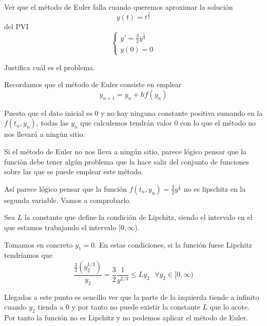 \begin{problem}[2]
Ver que el método de Euler falla cuando queremos aproximar la solución
\[y(t) = t^{\frac{3}{2}}\]
del PVI
\[\left\{ \begin{array}{l}y'=\frac{3}{2}y^{\frac{1}{3}} \\
y(0)=0\end{array}
\right.\]

Justifica cuál es el problema.

\solution
{}

Recordamos que el método de Euler consiste en emplear
\[y_{n+1} = y_n + h f(y_n)\]

Puesto que el dato inicial es 0 y no hay ninguna constante positiva sumando en la $f(t_n,y_n)$, todas las $y_n$ que calculemos tendrán valor 0 con lo que el método no nos llevará a ningún sitio.

Si el método de Euler no nos lleva a ningún sitio, parece lógico pensar que la función debe tener algún problema que la hace salir del conjunto de funciones sobre las que se puede emplear este método.

Así parece lógico pensar que la función $f(t_n,y_n)=\frac{3}{2}y^{\frac{1}{3}}$ no es lipschitz en la segunda variable. Vamos a comprobarlo.

Sea $L$ la constante que define la condición de Lipchitz, siendo el intervalo en el que estamos trabajando el intervalo $[0, \infty)$. 

Tomamos en concreto $y_1=0$. En estas condiciones, si la función fuese Lipchitz tendríamos que 
\[\frac{\frac{3}{2}(y_2^{1/3})}{y_2} = \frac{3}{2}\frac{1}{y^{2/3}}\leq L y_2 \ \ \ \forall y_2 \in [0,\infty)\]

Llegados a este punto es sencillo ver que la parte de la izquierda tiende a infinito cuando $y_2$ tienda a 0 y por tanto no puede existir la constante $L$ que lo acote. Por tanto la función no es Lipchitz y no podemos aplicar el método de Euler.
\end{problem}

